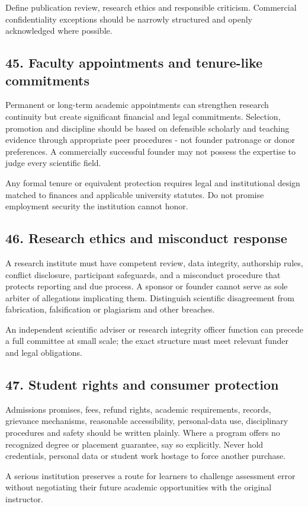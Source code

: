 Define publication review, research ethics and responsible criticism. Commercial confidentiality exceptions should be narrowly structured and openly acknowledged where possible.

\subsection{45. Faculty appointments and tenure-like commitments}

Permanent or long-term academic appointments can strengthen research continuity but create significant financial and legal commitments. Selection, promotion and discipline should be based on defensible scholarly and teaching evidence through appropriate peer procedures - not founder patronage or donor preferences. A commercially successful founder may not possess the expertise to judge every scientific field.

Any formal tenure or equivalent protection requires legal and institutional design matched to finances and applicable university statutes. Do not promise employment security the institution cannot honor.

\subsection{46. Research ethics and misconduct response}

A research institute must have competent review, data integrity, authorship rules, conflict disclosure, participant safeguards, and a misconduct procedure that protects reporting and due process. A sponsor or founder cannot serve as sole arbiter of allegations implicating them. Distinguish scientific disagreement from fabrication, falsification or plagiarism and other breaches.

An independent scientific adviser or research integrity officer function can precede a full committee at small scale; the exact structure must meet relevant funder and legal obligations.

\subsection{47. Student rights and consumer protection}

Admissions promises, fees, refund rights, academic requirements, records, grievance mechanisms, reasonable accessibility, personal-data use, disciplinary procedures and safety should be written plainly. Where a program offers no recognized degree or placement guarantee, say so explicitly. Never hold credentials, personal data or student work hostage to force another purchase.

A serious institution preserves a route for learners to challenge assessment error without negotiating their future academic opportunities with the original instructor.
